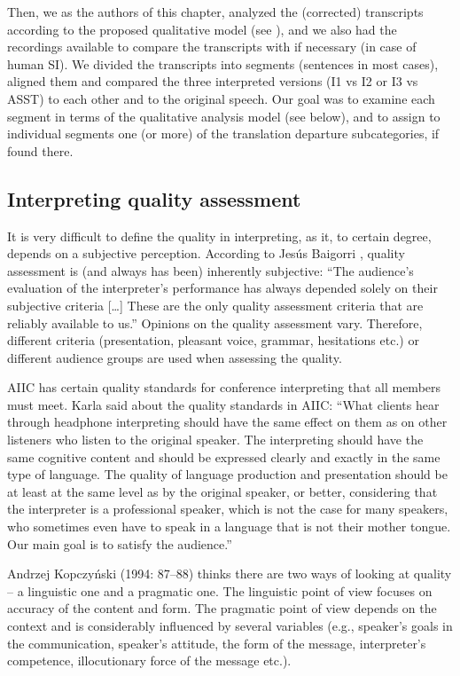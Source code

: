 \documentclass[output=paper]{langscibook}
\begin{document}
Then, we as the authors of this chapter, analyzed the (corrected) transcripts according to the proposed qualitative model (see ), and we also had the recordings available to compare the transcripts with if necessary (in case of human SI). We divided the transcripts into segments (sentences in most cases), aligned them and compared the three interpreted versions (I1 vs I2 or I3 vs ASST) to each other and to the original speech. Our goal was to examine each segment in terms of the qualitative analysis model (see below), and to assign to individual segments one (or more) of the translation departure subcategories, if found there.

\subsection{Interpreting quality assessment}\label{sec:kloudova:3.2}

It is very difficult to define the quality in interpreting, as it, to certain degree, depends on a subjective perception. According to Jesús Baigorri \citet[57]{Jalón2000}, quality assessment is (and always has been) inherently subjective: “The audience’s evaluation of the interpreter’s performance has always depended solely on their subjective criteria […] These are the only quality assessment criteria that are reliably available to us.” Opinions on the quality assessment vary. Therefore, different criteria (presentation, pleasant voice, grammar, hesitations etc.) or different audience groups are used when assessing the quality.

AIIC has certain quality standards for conference interpreting that all members must meet. Karla  \citet[155]{DéjeanleFéal1990} said about the quality standards in AIIC: “What clients hear through headphone interpreting should have the same effect on them as on other listeners who listen to the original speaker. The interpreting should have the same cognitive content and should be expressed clearly and exactly in the same type of language. The quality of language production and presentation should be at least at the same level as by the original speaker, or better, considering that the interpreter is a professional speaker, which is not the case for many speakers, who sometimes even have to speak in a language that is not their mother tongue. Our main goal is to satisfy the audience.”

Andrzej Kopczyński (1994: 87–88) thinks there are two ways of looking at quality – a linguistic one and a pragmatic one. The linguistic point of view focuses on accuracy of the content and form. The pragmatic point of view depends on the context and is considerably influenced by several variables (e.g., speaker’s goals in the communication, speaker’s attitude, the form of the message, interpreter’s competence, illocutionary force of the message etc.).
\end{document}
